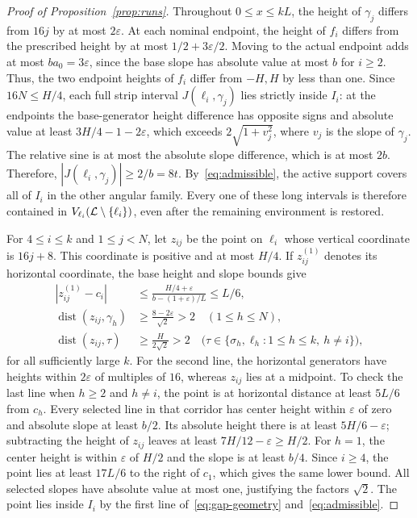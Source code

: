 \documentclass[11pt,letterpaper]{article}
\begin{document}
\begin{proof}[Proof of Proposition~\ref{prop:runs}]
Throughout $0\le x\le kL$, the height of $\gamma_j$ differs from $16j$ by at most $2\varepsilon$. At each nominal endpoint, the height of $f_i$ differs from the prescribed height by at most $1/2+3\varepsilon/2$. Moving to the actual endpoint adds at most $ba_0=3\varepsilon$, since the base slope has absolute value at most $b$ for $i\ge2$. Thus, the two endpoint heights of $f_i$ differ from $-H,H$ by less than one. Since $16N\le H/4$, each full strip interval $J(\ell_i,\gamma_j)$ lies strictly inside $I_i$: at the endpoints the base-generator height difference has opposite signs and absolute value at least $3H/4-1-2\varepsilon$, which exceeds $2\sqrt{1+v_j^2}$, where $v_j$ is the slope of $\gamma_j$. The relative sine is at most the absolute slope difference, which is at most $2b$. Therefore, $|J(\ell_i,\gamma_j)|\ge2/b=8t$. By~\eqref{eq:admissible}, the active support covers all of $I_i$ in the other angular family. Every one of these long intervals is therefore contained in $V_{\ell_i}(\mathcal L\setminus\{\ell_i\})$, even after the remaining environment is restored.

For $4\le i\le k$ and $1\le j<N$, let $z_{ij}$ be the point on $\ell_i$ whose vertical coordinate is $16j+8$. This coordinate is positive and at most $H/4$. If $z_{ij}^{(1)}$ denotes its horizontal coordinate, the base height and slope bounds give
\begin{equation}\label{eq:gap-geometry}
\begin{aligned}
 |z_{ij}^{(1)}-c_i|
 &\le\frac{H/4+\varepsilon}{b-(1+\varepsilon)/L}\le L/6,\\
 \operatorname{dist}(z_{ij},\gamma_h)
 &\ge\frac{8-2\varepsilon}{\sqrt2}>2\quad(1\le h\le N),\\
 \operatorname{dist}(z_{ij},\tau)
 &\ge\frac{H}{2\sqrt2}>2
 \quad\big(\tau\in\{\sigma_h,\ell_h:1\le h\le k,\ h\ne i\}\big),
\end{aligned}
\end{equation}
for all sufficiently large $k$. For the second line, the horizontal generators have heights within $2\varepsilon$ of multiples of $16$, whereas $z_{ij}$ lies at a midpoint. To check the last line when $h\ge2$ and $h\ne i$, the point is at horizontal distance at least $5L/6$ from $c_h$. Every selected line in that corridor has center height within $\varepsilon$ of zero and absolute slope at least $b/2$. Its absolute height there is at least $5H/6-\varepsilon$; subtracting the height of $z_{ij}$ leaves at least $7H/12-\varepsilon\ge H/2$. For $h=1$, the center height is within $\varepsilon$ of $H/2$ and the slope is at least $b/4$. Since $i\ge4$, the point lies at least $17L/6$ to the right of $c_1$, which gives the same lower bound. All selected slopes have absolute value at most one, justifying the factors $\sqrt2$. The point lies inside $I_i$ by the first line of~\eqref{eq:gap-geometry} and~\eqref{eq:admissible}.


\end{proof}
\end{document}
